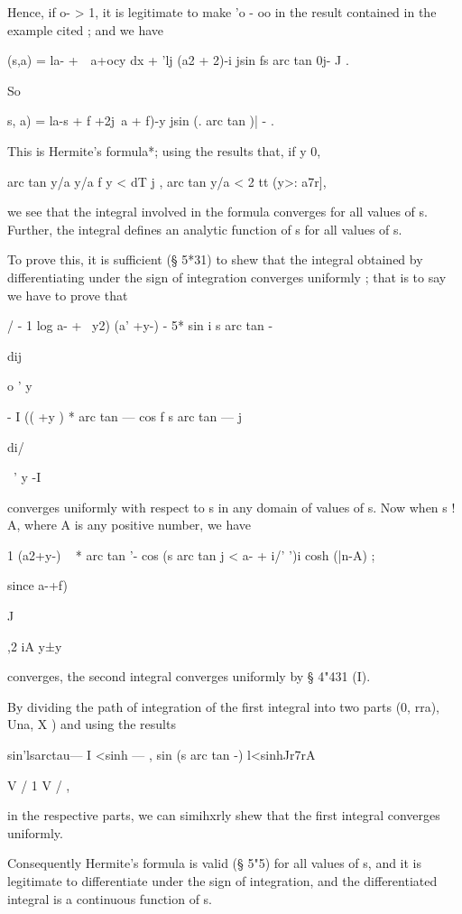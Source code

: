 Hence, if o- > 1, it is legitimate to make 'o - oo in the result
contained in the example cited ; and we have

 (s,a) = la- +\ \ a+ocy dx + 'lj (a2 + 2)-i jsin fs arc tan 0j- J .

So

  s, a) = la-s + f +2j\ a + f)-y jsin (. arc tan )| - .

This is Hermite's formula*; using the results that, if y 0,

arc tan y/a y/a f y < dT j , arc tan y/a < 2 tt (y>: a7r],

we see that the integral involved in the formula converges for all
values of s. Further, the integral defines an analytic function of s
for all values of s.

To prove this, it is sufficient (§ 5*31) to shew that the integral
obtained by differentiating under the sign of integration converges
uniformly ; that is to say we have to prove that

/ - 1 log a- + \ y2) (a' +y-) - 5* sin i s arc tan -

dij

o ' y

- I (( +y ) * arc tan — cos f s arc tan — j

di/

~' y -I

converges uniformly with respect to s in any domain of values of s.
Now when s ! A, where A is any positive number, we have

1 (a2+y-) ~ * arc tan '- cos (s arc tan j < a- + i/' ')i cosh (|n-A) ;

since a-+f)

  J

,2 iA y±y\

converges, the second integral converges uniformly by § 4"431 (I).

By dividing the path of integration of the first integral into two
parts (0, rra), Una, X ) and using the results

sin'lsarctau— I <sinh — , sin (s arc tan -) l<sinhJr7rA

V / 1 V / ,

in the respective parts, we can simihxrly shew that the first integral
converges uniformly.

Consequently Hermite's formula is valid (§ 5"5) for all values of s,
and it is legitimate to differentiate under the sign of integration,
and the differentiated integral is a continuous function of s.

